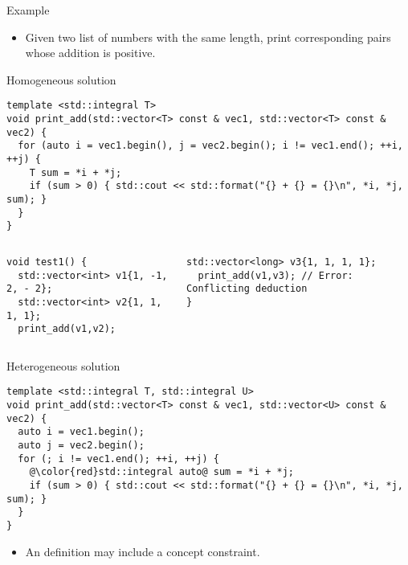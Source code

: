 \begin{frame}[t,fragile]{Example}
  \begin{itemize}
    \item Given two list of numbers with the same length, 
          print corresponding pairs whose addition is positive.
  \end{itemize}
\begin{block}{Homogeneous solution}
\begin{lstlisting}
template <std::integral T>
void print_add(std::vector<T> const & vec1, std::vector<T> const & vec2) {
  for (auto i = vec1.begin(), j = vec2.begin(); i != vec1.end(); ++i, ++j) {
    T sum = *i + *j;
    if (sum > 0) { std::cout << std::format("{} + {} = {}\n", *i, *j, sum); }
  }
}
\end{lstlisting}
\end{block}

\begin{columns}[T]
\begin{lstlisting}[basicstyle=\tiny]
void test1() {
  std::vector<int> v1{1, -1, 2, - 2};
  std::vector<int> v2{1, 1, 1, 1};
  print_add(v1,v2);
\end{lstlisting}

\begin{lstlisting}[basicstyle=\tiny]
  std::vector<long> v3{1, 1, 1, 1};
  print_add(v1,v3); // Error: Conflicting deduction
}
\end{lstlisting}
\end{columns}

\end{frame}

\begin{frame}[t,fragile]
\begin{block}{Heterogeneous solution}
\begin{lstlisting}[escapechar=@]
template <std::integral T, std::integral U>
void print_add(std::vector<T> const & vec1, std::vector<U> const & vec2) {
  auto i = vec1.begin();
  auto j = vec2.begin();
  for (; i != vec1.end(); ++i, ++j) {
    @\color{red}std::integral auto@ sum = *i + *j;
    if (sum > 0) { std::cout << std::format("{} + {} = {}\n", *i, *j, sum); }
  }
}
\end{lstlisting}
\end{block}
\begin{itemize}
  \item An  definition may include a concept constraint.
\end{itemize}
\end{frame}

